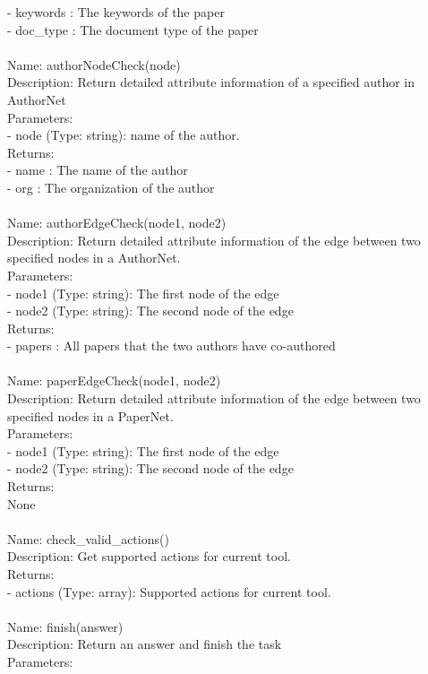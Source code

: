 \begin{tcolorbox}[breakable,title=Prompt Details for Academia]
- keywords : The keywords of the paper\\
- doc\_type : The document type of the paper\\
\\
Name: authorNodeCheck(node)\\
Description: Return detailed attribute information of a specified author in AuthorNet\\
Parameters:\\
- node (Type: string): name of the author.\\
Returns:\\
- name : The name of the author\\
- org : The organization of the author\\
\\
Name: authorEdgeCheck(node1, node2)\\
Description: Return detailed attribute information of the edge between two specified nodes in a AuthorNet.\\
Parameters:\\
- node1 (Type: string): The first node of the edge\\
- node2 (Type: string): The second node of the edge\\
Returns:\\
- papers : All papers that the two authors have co-authored\\
\\
Name: paperEdgeCheck(node1, node2)\\
Description: Return detailed attribute information of the edge between two specified nodes in a PaperNet.\\
Parameters:\\
- node1 (Type: string): The first node of the edge\\
- node2 (Type: string): The second node of the edge\\
Returns:\\
None\\
\\
Name: check\_valid\_actions()\\
Description: Get supported actions for current tool.\\
Returns:\\
- actions (Type: array): Supported actions for current tool.\\
\\
Name: finish(answer)\\
Description: Return an answer and finish the task\\
Parameters:\\

\end{tcolorbox}
